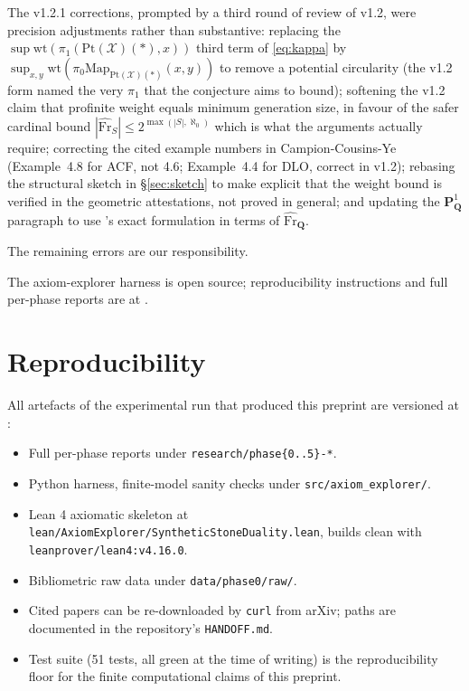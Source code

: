 \documentclass[11pt]{article}
\theoremstyle{definition}
\theoremstyle{plain}
\theoremstyle{remark}
\newcommand{\Pt}{\mathrm{Pt}}
\newcommand{\Map}{\mathrm{Map}}
\newcommand{\Frhat}{\widehat{\mathrm{Fr}}}
\newcommand{\Pone}{\mathbf{P}^{1}}
\newcommand{\Q}{\mathbf{Q}}
\begin{document}
The v1.2.1 corrections, prompted by a third round of review of v1.2,
were precision adjustments rather than substantive: replacing the
$\sup \mathrm{wt}(\pi_1(\Pt(\mathcal X)(\ast),x))$ third term of \eqref{eq:kappa}
by $\sup_{x,y} \mathrm{wt}(\pi_0\Map_{\Pt(\mathcal X)(\ast)}(x,y))$ to remove a
potential circularity (the v1.2 form named the very $\pi_1$ that the
conjecture aims to bound); softening the v1.2 claim that profinite
weight equals minimum generation size, in favour of the safer cardinal
bound $|\Frhat_S| \le 2^{\max(|S|,\aleph_0)}$ which is what the
arguments actually require; correcting the cited example numbers in
Campion-Cousins-Ye (Example~4.8 for ACF, not 4.6; Example~4.4 for DLO,
correct in v1.2); rebasing the structural sketch in
\S\ref{sec:sketch} to make explicit that the weight bound is verified
in the geometric attestations, not proved in general; and updating the
$\Pone_{\Q}$ paragraph to use \cite[Remark 7.14]{HHLMMW2025}'s exact
formulation in terms of $\Frhat_{\Q}$.

The remaining errors are our responsibility.

The axiom-explorer harness is open source; reproducibility instructions and
full per-phase reports are at \cite{AxiomExplorerRepo}.

\section{Reproducibility}

All artefacts of the experimental run that produced this preprint are
versioned at \cite{AxiomExplorerRepo}:

\begin{itemize}
\item Full per-phase reports under \texttt{research/phase\{0..5\}-*}.
\item Python harness, finite-model sanity checks under
\texttt{src/axiom\_explorer/}.
\item Lean 4 axiomatic skeleton at
\texttt{lean/AxiomExplorer/SyntheticStoneDuality.lean}, builds clean with
\texttt{leanprover/lean4:v4.16.0}.
\item Bibliometric raw data under \texttt{data/phase0/raw/}.
\item Cited papers can be re-downloaded by \texttt{curl} from arXiv; paths
are documented in the repository's \texttt{HANDOFF.md}.
\item Test suite (51 tests, all green at the time of writing) is the
reproducibility floor for the finite computational claims of this preprint.
\end{itemize}
\end{document}
